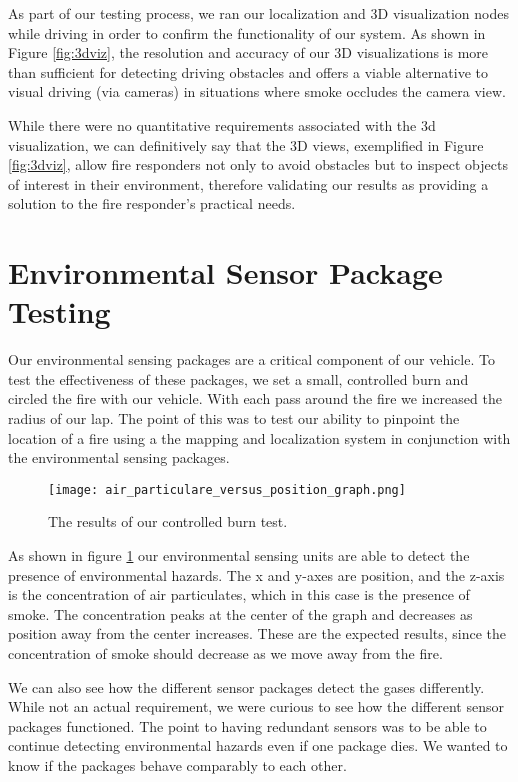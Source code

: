 As part of our testing process, we ran our localization and 3D visualization nodes while driving in order to confirm the functionality of our system. As shown in Figure \ref{fig:3dviz}, the resolution and accuracy of our 3D visualizations is more than sufficient for detecting driving obstacles and offers a viable alternative to visual driving (via cameras) in situations where smoke occludes the camera view.

While there were no quantitative requirements associated with the 3d visualization, we can definitively say that the 3D views, exemplified in Figure \ref{fig:3dviz}, allow fire responders not only to avoid obstacles but to inspect objects of interest in their environment, therefore validating our results as providing a solution to the fire responder's practical needs.

\section{Environmental Sensor Package Testing}
Our environmental sensing packages are a critical component of our vehicle.  To test the effectiveness of these packages, we set a small, controlled burn and circled the fire with our vehicle.  With each pass around the fire we increased the radius of our lap.  The point of this was to test our ability to pinpoint the location of a fire using a the mapping and localization system in conjunction with the environmental sensing packages.

\begin{figure}[H]
\centerline{\texttt{[image: air\_particulare\_versus\_position\_graph.png]}}
\caption[]{The results of our controlled burn test.}
\label{fig:air_particulate_versus_position_graph}
\end{figure}

As shown in figure \ref{fig:air_particulate_versus_position_graph} our environmental sensing units are able to detect the presence of environmental hazards.  The x and y-axes are position, and the z-axis is the concentration of air particulates, which in this case is the presence of smoke.  The concentration peaks at the center of the graph and decreases as position away from the center increases.  These are the expected results, since the concentration of smoke should decrease as we move away from the fire.

We can also see how the different sensor packages detect the gases differently.  While not an actual requirement, we were curious to see how the different sensor packages functioned.  The point to having redundant sensors was to be able to continue detecting environmental hazards even if one package dies.  We wanted to know if the packages behave comparably to each other.



